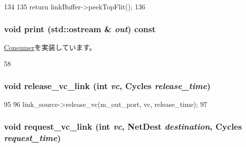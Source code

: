 \begin{DoxyCode}
134 {
135     return linkBuffer->peekTopFlit();
136 }
\end{DoxyCode}
\hypertarget{classNetworkLink_ac55fe386a101fbae38c716067c9966a0}{
\subsubsection[{print}]{\setlength{\rightskip}{0pt plus 5cm}void print (std::ostream \& {\em out}) const}}
\label{classNetworkLink_ac55fe386a101fbae38c716067c9966a0}


\hyperlink{classConsumer_a3ea5f7af5db62cc24f4e40df9ea5c971}{Consumer}を実装しています。


\begin{DoxyCode}
58 {}
\end{DoxyCode}
\hypertarget{classNetworkLink_a63228acf1c1f11d1b99a4acfacfb21d4}{
\subsubsection[{release\_\-vc\_\-link}]{\setlength{\rightskip}{0pt plus 5cm}void release\_\-vc\_\-link (int {\em vc}, \/  {\bf Cycles} {\em release\_\-time})}}
\label{classNetworkLink_a63228acf1c1f11d1b99a4acfacfb21d4}



\begin{DoxyCode}
95 {
96     link_source->release_vc(m_out_port, vc, release_time);
97 }
\end{DoxyCode}
\hypertarget{classNetworkLink_a947ef78a50126a1a6e2fa8008376aec1}{
\subsubsection[{request\_\-vc\_\-link}]{\setlength{\rightskip}{0pt plus 5cm}void request\_\-vc\_\-link (int {\em vc}, \/  {\bf NetDest} {\em destination}, \/  {\bf Cycles} {\em request\_\-time})}}
\label{classNetworkLink_a947ef78a50126a1a6e2fa8008376aec1}



